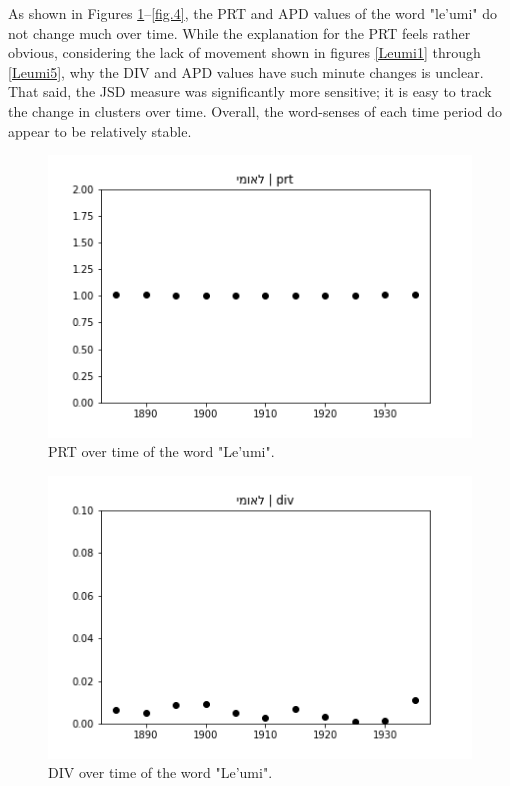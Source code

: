 \documentclass[10pt, a4paper]{article}
\begin{document}
As shown in Figures \ref{fig.1}--\ref{fig.4}, the PRT and APD values of the word "le'umi" do not change much over time. While the explanation for the PRT feels rather obvious, considering the lack of movement shown in figures \ref{Leumi1} through \ref{Leumi5}, why the DIV and APD values have such minute changes is unclear. That said, the JSD measure was significantly more sensitive; it is easy to track the change in clusters over time. Overall, the word-senses of each time period do appear to be relatively stable.
\begin{figure}[!h]
\begin{center}
\includegraphics[scale=0.5]{LREC_PAPER/leumi/לאומי_prt.png}
\caption{PRT over time of the word "Le'umi".}
\label{fig.1}
\end{center}
\end{figure}
\begin{figure}[!h]
\begin{center}
\includegraphics[scale=0.5]{LREC_PAPER/leumi/לאומי_div.png}
\caption{DIV over time of the word "Le'umi".}
\label{fig.2}
\end{center}
\end{figure}
\end{document}

